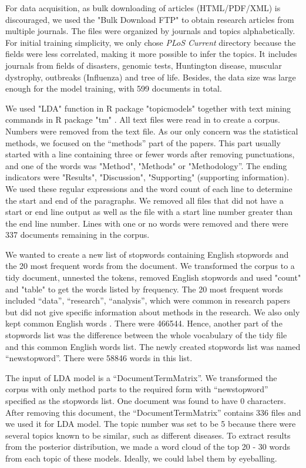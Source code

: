 \documentclass[11pt]{article}
\begin{document}
For data acquisition, as bulk downloading of articles (HTML/PDF/XML) is discouraged, we used the "Bulk Download FTP" to obtain research articles from multiple journals. The files were organized by journals and topics alphabetically. For initial training simplicity, we only chose \textit{PLoS Current} directory because the fields were less correlated, making it more possible to infer the topics. It includes journals from fields of disasters, genomic tests, Huntington disease, muscular dystrophy, outbreaks (Influenza) and tree of life. Besides, the data size was large enough for the model training, with 599 documents in total.

We used "LDA" function in R package "topicmodels" \cite{topicmodels} together with text mining commands in R package "tm" \cite{tm}. All text files were read in to create a corpus. Numbers were removed from the text file. As our only concern was the statistical methods, we focused on the “methods” part of the papers. This part usually started with a line containing three or fewer words after removing punctuations, and one of the words was "Method", "Methods" or "Methodology”. The ending indicators were "Results", "Discussion", "Supporting" (supporting information). We used these regular expressions and the word count of each line to determine the start and end of the paragraphs. We removed all files that did not have a start or end line output as well as the file with a start line number greater than the end line number. Lines with one or no words were removed and there were 337 documents remaining in the corpus.

We wanted to create a new list of stopwords containing English stopwords and the 20 most frequent words from the document. We transformed the corpus to a tidy document, unnested the tokens, removed English stopwords and used "count" and "table" to get the words listed by frequency. The 20 most frequent words included “data”, “research”, “analysis”, which were common in research papers but did not give specific information about methods in the research. We also only kept common English words \cite{words}. There were 466544. Hence, another part of the stopwords list was the difference between the whole vocabulary of the tidy file and this common English words list. The newly created stopwords list was named “newstopword”. There were 58846 words in this list.

The input of LDA model is a “DocumentTermMatrix”. We transformed the corpus with only method parts to the required form with “newstopword” specified as the stopwords list. One document was found to have 0 characters. After removing this document, the “DocumentTermMatrix” contains 336 files and we used it for LDA model. The topic number was set to be 5 because there were several topics known to be similar, such as different diseases. To extract results from the posterior distribution, we made a word cloud of the top 20 - 30 words from each topic of these models. Ideally, we could label them by eyeballing. 
\end{document}
